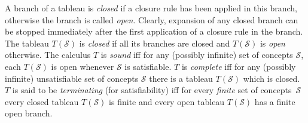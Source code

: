 \documentclass[leqno
,pdflatex
,prodmode
,acmtocl
]{acmsmall}
\begin{document}
A branch of a tableau is \emph{closed} if a closure rule has been applied
in this branch, otherwise the branch is called \emph{open}.
Clearly, expansion of any closed branch can be stopped immediately after
the first application of a closure rule in the branch.
The tableau $T(\mathcal{S})$ is \emph{closed} if all its branches are
closed and $T(\mathcal{S})$ is \emph{open} otherwise.
The calculus $T$ is \emph{sound} iff
for any (possibly infinite)
set of concepts
$\mathcal{S}$, each $T(\mathcal{S})$ is open whenever $\mathcal{S}$ is satisfiable.
$T$ is \emph{complete} iff for any (possibly infinite) unsatisfiable set of concepts
$\mathcal{S}$ there is a tableau $T(\mathcal{S})$ which is closed.
$T$ is said to be \emph{terminating} (for satisfiability) iff 
for every \emph{finite} set of concepts~$\mathcal{S}$
every closed tableau $T(\mathcal{S})$ is finite and
every open tableau $T(\mathcal{S})$ has a finite open branch.
\end{document}

